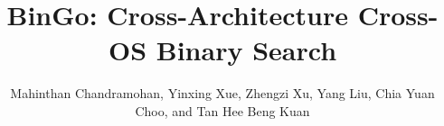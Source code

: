 \documentclass{fse-xie}
\begin{document}
%
\title{BinGo: Cross-Architecture Cross-OS Binary Search}

\author{
\alignauthor Mahinthan Chandramohan\textsuperscript{{\normalsize \dag}}, Yinxing Xue\textsuperscript{{\normalsize \dag}}, Zhengzi Xu\textsuperscript{{\normalsize \dag}}, Yang Liu\textsuperscript{{\normalsize \dag}}, Chia Yuan Choo\textsuperscript{{\normalsize *}}, and  Tan Hee Beng Kuan\textsuperscript{{\normalsize \dag}} \\
\\
\\
}

\maketitle



\begin{abstract}

\end{abstract}








%

%
%
%
%
%
%
%
%
%
 


%
%
\newpage
\balance



%

%
\end{document}
